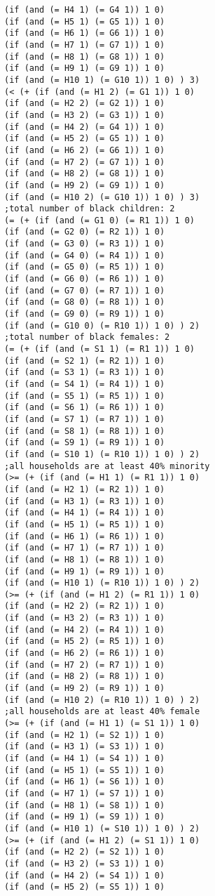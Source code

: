 \documentclass[5p,times,11pt]{elsarticle}
\begin{document}
\begin{verbatim}
(if (and (= H4 1) (= G4 1)) 1 0)
(if (and (= H5 1) (= G5 1)) 1 0)
(if (and (= H6 1) (= G6 1)) 1 0)
(if (and (= H7 1) (= G7 1)) 1 0)
(if (and (= H8 1) (= G8 1)) 1 0)
(if (and (= H9 1) (= G9 1)) 1 0)
(if (and (= H10 1) (= G10 1)) 1 0) ) 3)
(< (+ (if (and (= H1 2) (= G1 1)) 1 0)
(if (and (= H2 2) (= G2 1)) 1 0)
(if (and (= H3 2) (= G3 1)) 1 0)
(if (and (= H4 2) (= G4 1)) 1 0)
(if (and (= H5 2) (= G5 1)) 1 0)
(if (and (= H6 2) (= G6 1)) 1 0)
(if (and (= H7 2) (= G7 1)) 1 0)
(if (and (= H8 2) (= G8 1)) 1 0)
(if (and (= H9 2) (= G9 1)) 1 0)
(if (and (= H10 2) (= G10 1)) 1 0) ) 3)
;total number of black children: 2
(= (+ (if (and (= G1 0) (= R1 1)) 1 0)
(if (and (= G2 0) (= R2 1)) 1 0)
(if (and (= G3 0) (= R3 1)) 1 0)
(if (and (= G4 0) (= R4 1)) 1 0)
(if (and (= G5 0) (= R5 1)) 1 0)
(if (and (= G6 0) (= R6 1)) 1 0)
(if (and (= G7 0) (= R7 1)) 1 0)
(if (and (= G8 0) (= R8 1)) 1 0)
(if (and (= G9 0) (= R9 1)) 1 0)
(if (and (= G10 0) (= R10 1)) 1 0) ) 2)
;total number of black females: 2
(= (+ (if (and (= S1 1) (= R1 1)) 1 0)
(if (and (= S2 1) (= R2 1)) 1 0)
(if (and (= S3 1) (= R3 1)) 1 0)
(if (and (= S4 1) (= R4 1)) 1 0)
(if (and (= S5 1) (= R5 1)) 1 0)
(if (and (= S6 1) (= R6 1)) 1 0)
(if (and (= S7 1) (= R7 1)) 1 0)
(if (and (= S8 1) (= R8 1)) 1 0)
(if (and (= S9 1) (= R9 1)) 1 0)
(if (and (= S10 1) (= R10 1)) 1 0) ) 2)
;all households are at least 40% minority
(>= (+ (if (and (= H1 1) (= R1 1)) 1 0)
(if (and (= H2 1) (= R2 1)) 1 0)
(if (and (= H3 1) (= R3 1)) 1 0)
(if (and (= H4 1) (= R4 1)) 1 0)
(if (and (= H5 1) (= R5 1)) 1 0)
(if (and (= H6 1) (= R6 1)) 1 0)
(if (and (= H7 1) (= R7 1)) 1 0)
(if (and (= H8 1) (= R8 1)) 1 0)
(if (and (= H9 1) (= R9 1)) 1 0)
(if (and (= H10 1) (= R10 1)) 1 0) ) 2)
(>= (+ (if (and (= H1 2) (= R1 1)) 1 0)
(if (and (= H2 2) (= R2 1)) 1 0)
(if (and (= H3 2) (= R3 1)) 1 0)
(if (and (= H4 2) (= R4 1)) 1 0)
(if (and (= H5 2) (= R5 1)) 1 0)
(if (and (= H6 2) (= R6 1)) 1 0)
(if (and (= H7 2) (= R7 1)) 1 0)
(if (and (= H8 2) (= R8 1)) 1 0)
(if (and (= H9 2) (= R9 1)) 1 0)
(if (and (= H10 2) (= R10 1)) 1 0) ) 2)
;all households are at least 40% female
(>= (+ (if (and (= H1 1) (= S1 1)) 1 0)
(if (and (= H2 1) (= S2 1)) 1 0)
(if (and (= H3 1) (= S3 1)) 1 0)
(if (and (= H4 1) (= S4 1)) 1 0)
(if (and (= H5 1) (= S5 1)) 1 0)
(if (and (= H6 1) (= S6 1)) 1 0)
(if (and (= H7 1) (= S7 1)) 1 0)
(if (and (= H8 1) (= S8 1)) 1 0)
(if (and (= H9 1) (= S9 1)) 1 0)
(if (and (= H10 1) (= S10 1)) 1 0) ) 2)
(>= (+ (if (and (= H1 2) (= S1 1)) 1 0)
(if (and (= H2 2) (= S2 1)) 1 0)
(if (and (= H3 2) (= S3 1)) 1 0)
(if (and (= H4 2) (= S4 1)) 1 0)
(if (and (= H5 2) (= S5 1)) 1 0)

\end{verbatim}
\end{document}
